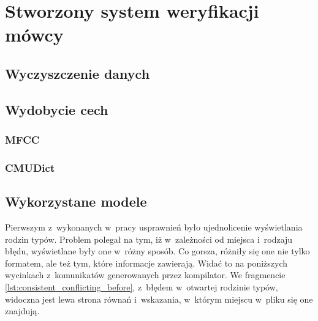 \chapter{Stworzony system weryfikacji mówcy}\label{chap:badania}

\section{Wyczyszczenie danych}
\label{sec:data_cleaning}

\section{Wydobycie cech}
\label{sec:data_wrangling}

\subsection{MFCC}

\subsection{CMUDict}

\section{Wykorzystane modele}
\label{sec:data_models}

\label{sec:gmm_ubm}

Pierwszym z~wykonanych w~pracy usprawnień było ujednolicenie wyświetlania rodzin
typów. Problem polegał na tym, iż w~zależności od miejsca i~rodzaju błędu,
wyświetlane były one w~różny sposób. Co gorsza, różniły się one nie tylko
formatem, ale też tym, które informacje zawierają. Widać to na poniższych
wycinkach z~komunikatów generowanych przez kompilator. We fragmencie
\ref{lst:consistent_conflicting_before}, z~błędem w~otwartej rodzinie typów,
widoczna jest lewa strona równań i~wskazania, w~którym miejscu w~pliku się one
znajdują.

\label{sec:gmm_ubm}

\label{sec:dnn_gmm}

